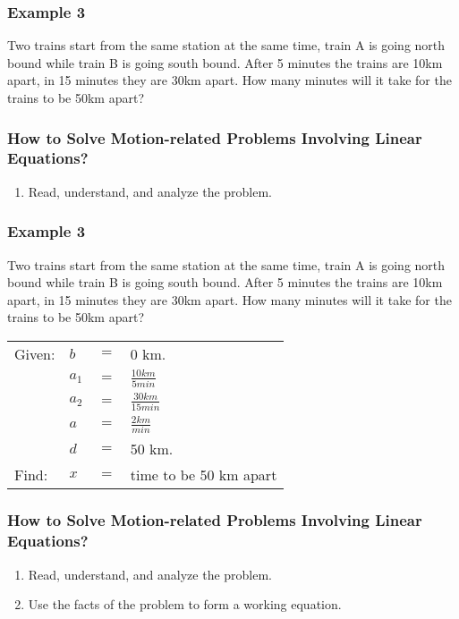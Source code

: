 \documentclass[14pt]{beamer}
\begin{document}
    \begin{frame}
    	\frametitle{Example 3}
    	Two trains start from the same station at the same time, train A is going north
    	bound while train B is going south bound. After 5 minutes the trains are 10km
    	apart, in 15 minutes they are 30km apart. How many minutes will it take for the
    	trains to be 50km apart?
    \end{frame}
    
    \begin{frame}
    	\frametitle{How  to Solve Motion-related Problems Involving Linear Equations?}
    	
    	\begin{enumerate}  
    		\item Read, understand, and analyze the problem. 
    	\end{enumerate}  
    \end{frame}
    
    \begin{frame}
    	\frametitle{Example 3}
    	\small Two trains start from the same station at the same time, train A is going north
bound while train B is going south bound. After 5 minutes the trains are 10km
apart, in 15 minutes they are 30km apart. How many minutes will it take for the
trains to be 50km apart?
    	    	
    	\vone
    	\normalsize
    	\begin{tabular}{llll}
    		Given: & \pause $ b $ & $ = $ & 0 km. \\
    		& \pause $ a_1 $ & $ = $ & $ \frac{10km}{5min}$ \\
    		& \pause $ a_2 $ & $ = $ & $ \frac{30km}{15min}$ \\
    		& \pause $ a $ & $ = $ & $ \frac{2km}{min}$ \\
    		& \pause $ d $ & $ = $ & 50 km. \\
    		\pause Find: & $ x $ & $ = $ & time to be 50 km apart \\  
    	\end{tabular}
    \end{frame}  
    
    \begin{frame}
    	\frametitle{How  to Solve Motion-related Problems Involving Linear Equations?}
    	
    	\begin{enumerate}  
    		\item Read, understand, and analyze the problem. 
    		\item Use the facts of the problem to form a working equation.
    	\end{enumerate}  
    \end{frame}
    
\end{document}
